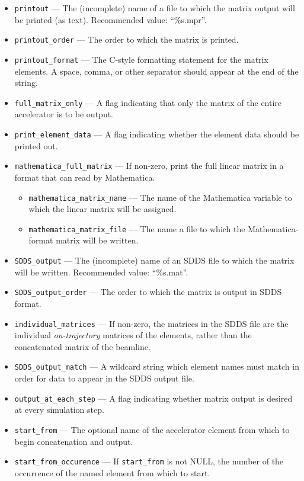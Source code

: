 \documentclass[11pt]{article}
\begin{document}
\begin{itemize}
\item \verb|printout| --- The (incomplete) name of a file to which the 
matrix output will be printed (as text).  Recommended value: ``\%s.mpr''.
\item \verb|printout_order| --- The order to which the matrix is printed.
\item \verb|printout_format| --- The C-style formatting statement for the matrix elements. A space, comma, or other separator
  should appear at the end of the string.
\item \verb|full_matrix_only| --- A flag indicating that only the matrix of
the entire accelerator is to be output.
\item \verb|print_element_data| --- A flag indicating whether the element data should be printed out.
\item \verb|mathematica_full_matrix| --- If non-zero, print the full linear matrix in a format that can read by Mathematica.
  \begin{itemize}
  \item \verb|mathematica_matrix_name| --- The name of the Mathematica variable to which the linear matrix will be assigned.
  \item \verb|mathematica_matrix_file| --- The name a file to which the Mathematica-format matrix will be written.
  \end{itemize}
\item \verb|SDDS_output| --- The (incomplete) name of an SDDS 
file to which the matrix will be written.  Recommended value: ``\%s.mat''.
\item \verb|SDDS_output_order| --- The order to which the matrix is output in SDDS format.
\item \verb|individual_matrices| --- If non-zero, the matrices in the SDDS file are the individual
{\em on-trajectory} matrices of the elements, rather than the concatenated matrix of the beamline.
\item \verb|SDDS_output_match| --- A wildcard string which element names must match in
order for data to appear in the SDDS output file.
\item \verb|output_at_each_step| --- A flag indicating whether matrix output
is desired at every simulation step.
\item \verb|start_from| --- The optional name of the accelerator element
from which to begin concatenation and output.
\item \verb|start_from_occurence| --- If \verb|start_from| is not NULL, the
  number of the occurrence of the named element from which to start.
\end{itemize}
\end{document}

